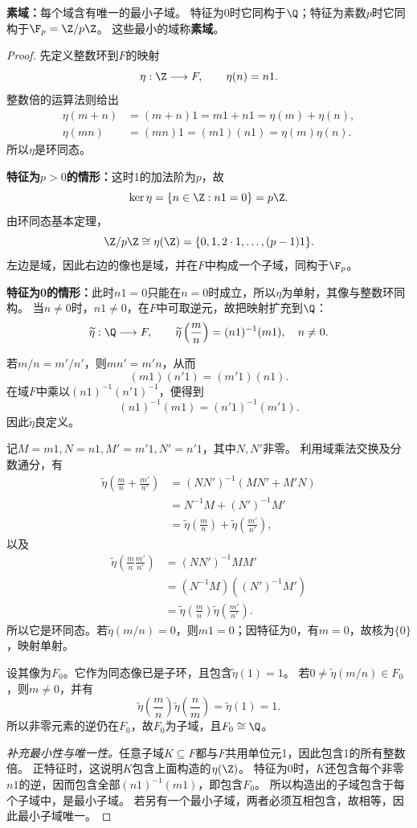 \begin{theorem}
\textbf{素域：}每个域含有唯一的最小子域。
特征为0时它同构于$\Q$；特征为素数$p$时它同构于$\F_p=\Z/p\Z$。
这些最小的域称\textbf{素域}。
\end{theorem}
\begin{proof}
先定义整数环到$F$的映射
\[
\eta:\Z\longrightarrow F,\qquad \eta(n)=n1.
\]
整数倍的运算法则给出
\[
\begin{aligned}
\eta(m+n)&=(m+n)1=m1+n1=\eta(m)+\eta(n),\\
\eta(mn)&=(mn)1=(m1)(n1)=\eta(m)\eta(n).
\end{aligned}
\]
所以$\eta$是环同态。

\textbf{特征为$p>0$的情形：}这时1的加法阶为$p$，故
\[
\ker\eta=\{n\in\Z:n1=0\}=p\Z.
\]
由环同态基本定理，
\[
\Z/p\Z\cong\eta(\Z)=\{0,1,2\cdot1,\ldots,(p-1)1\}.
\]
左边是域，因此右边的像也是域，并在$F$中构成一个子域，同构于$\F_p$。

\textbf{特征为0的情形：}此时$n1=0$只能在$n=0$时成立，所以$\eta$为单射，其像与整数环同构。
当$n\neq0$时，$n1\neq0$，在$F$中可取逆元，故把映射扩充到$\Q$：
\[
\widetilde\eta:\Q\longrightarrow F,\qquad
\widetilde\eta\left(\frac mn\right)=(n1)^{-1}(m1),\quad n\neq0.
\]

若$m/n=m'/n'$，则$mn'=m'n$，从而
\[
(m1)(n'1)=(m'1)(n1).
\]
在域$F$中乘以$(n1)^{-1}(n'1)^{-1}$，便得到
\[
(n1)^{-1}(m1)=(n'1)^{-1}(m'1).
\]
因此$\widetilde\eta$良定义。

记$M=m1,N=n1,M'=m'1,N'=n'1$，其中$N,N'$非零。
利用域乘法交换及分数通分，有
\[
\begin{aligned}
\widetilde\eta\left(\frac mn+\frac{m'}{n'}\right)
&=(NN')^{-1}(MN'+M'N)\\
&=N^{-1}M+(N')^{-1}M'\\
&=\widetilde\eta\left(\frac mn\right)
+\widetilde\eta\left(\frac{m'}{n'}\right),
\end{aligned}
\]
以及
\[
\begin{aligned}
\widetilde\eta\left(\frac mn\frac{m'}{n'}\right)
&=(NN')^{-1}MM'\\
&=(N^{-1}M)((N')^{-1}M')\\
&=\widetilde\eta\left(\frac mn\right)
\widetilde\eta\left(\frac{m'}{n'}\right).
\end{aligned}
\]
所以它是环同态。若$\widetilde\eta(m/n)=0$，则$m1=0$；因特征为0，有$m=0$，故核为$\{0\}$，映射单射。

设其像为$F_0$。它作为同态像已是子环，且包含$\widetilde\eta(1)=1$。
若$0\neq\widetilde\eta(m/n)\in F_0$，则$m\neq0$，并有
\[
\widetilde\eta\left(\frac mn\right)
\widetilde\eta\left(\frac nm\right)
=\widetilde\eta(1)=1.
\]
所以非零元素的逆仍在$F_0$，故$F_0$为子域，且$F_0\cong\Q$。

\textit{补充最小性与唯一性。}任意子域$K\subseteq F$都与$F$共用单位元1，因此包含1的所有整数倍。
正特征时，这说明$K$包含上面构造的$\eta(\Z)$。
特征为0时，$K$还包含每个非零$n1$的逆，因而包含全部$(n1)^{-1}(m1)$，即包含$F_0$。
所以构造出的子域包含于每个子域中，是最小子域。
若另有一个最小子域，两者必须互相包含，故相等，因此最小子域唯一。
\end{proof}



